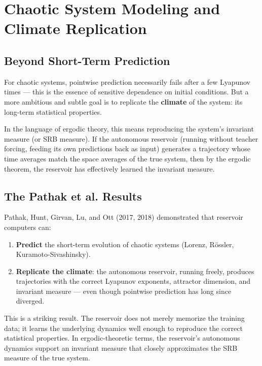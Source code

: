 \bigskip


\section{Chaotic System Modeling and Climate Replication}\label{sec:17.2}

\subsection{Beyond Short-Term Prediction}\label{sec:17.2.1}

For chaotic systems, pointwise prediction necessarily fails after a few Lyapunov times --- this is the essence of sensitive dependence on initial conditions. But a more ambitious and subtle goal is to replicate the \textbf{climate} of the system: its long-term statistical properties.

In the language of ergodic theory, this means reproducing the system's invariant measure (or SRB measure). If the autonomous reservoir (running without teacher forcing, feeding its own predictions back as input) generates a trajectory whose time averages match the space averages of the true system, then by the ergodic theorem, the reservoir has effectively learned the invariant measure.

\subsection{The Pathak et al. Results}\label{sec:17.2.2}

Pathak, Hunt, Girvan, Lu, and Ott (2017, 2018) demonstrated that reservoir computers can:

\begin{enumerate}[nosep]
  \item \textbf{Predict} the short-term evolution of chaotic systems (Lorenz, Rössler, Kuramoto-Sivashinsky).
  \item \textbf{Replicate the climate}: the autonomous reservoir, running freely, produces trajectories with the correct Lyapunov exponents, attractor dimension, and invariant measure --- even though pointwise prediction has long since diverged.
\end{enumerate}

This is a striking result. The reservoir does not merely memorize the training data; it learns the underlying dynamics well enough to reproduce the correct statistical properties. In ergodic-theoretic terms, the reservoir's autonomous dynamics support an invariant measure that closely approximates the SRB measure of the true system.

